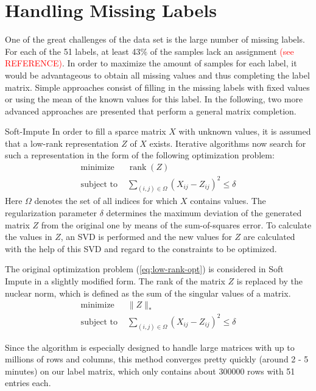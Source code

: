 \section{Handling Missing Labels}
One of the great challenges of the data set is the large number of missing labels. For each of the 51 labels, at least 43\% of the samples lack an assignment \textcolor{red}{(see REFERENCE)}. In order to maximize the amount of samples for each label, it would be advantageous to obtain all missing values and thus completing the label matrix. Simple approaches consist of filling in the missing labels with fixed values or using the mean of the known values for this label. In the following, two more advanced approaches are presented that perform a general matrix completion.

\begin{subsection}{Soft-Impute}
	In order to fill a sparce matrix $X$ with unknown values, it is assumed that a low-rank representation $Z$ of $X$ exists. Iterative algorithms now search for such a representation in the form of the following optimization problem:	
	\begin{equation}
	\begin{split}
	    \label{eq:low-rank-opt}
	    \text{minimize } &\operatorname{rank}(Z) \\
	    \text{subject to } &\sum_{(i,j)\in \Omega} (X_{ij} - Z_{ij})^2 \leq \delta
	\end{split}
	\end{equation}
	Here $\Omega$ denotes the set of all indices for which $X$ contains values. The regularization parameter $\delta$ determines the maximum deviation of the generated matrix $Z$ from the original one by means of the sum-of-squares error. To calculate the values in $Z$, an SVD is performed and the new values for $Z$ are calculated with the help of this SVD and regard to the constraints to be optimized.\par
	The original optimization problem (\ref{eq:low-rank-opt}) is considered in Soft Impute in a slightly modified form. The rank of the matrix $Z$ is replaced by the nuclear norm, which is defined as the sum of the singular values of a matrix. \cite{mazumder2010spectral}
	\begin{equation}
    \begin{split} \label{eq:low-rank-soft-opt}
	\text{minimize } & \| Z \|_* \\
	\text{subject to } &\sum_{(i,j)\in \Omega} (X_{ij} - Z_{ij})^2 \leq \delta
	\end{split}
	\end{equation}
	
	Since the algorithm is especially designed to handle large matrices with up to millions of rows and columns, this method converges pretty quickly (around 2 - 5 minutes) on our label matrix, which only contains about 300000 rows with 51 entries each. 
\end{subsection}

